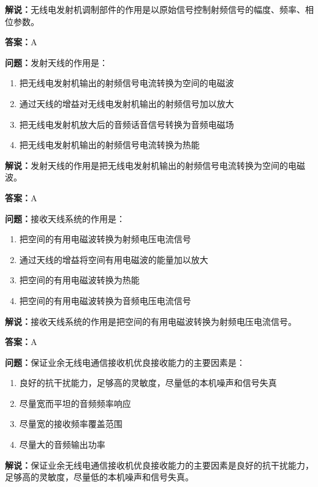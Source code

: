 \textbf{解说：}无线电发射机调制部件的作用是以原始信号控制射频信号的幅度、频率、相位参数。%

\textbf{答案：}A

\textbf{问题：}发射天线的作用是：

\begin{enumerate}[label=\Alph*), leftmargin=1cm]
	\item 把无线电发射机输出的射频信号电流转换为空间的电磁波
	\item 通过天线的增益对无线电发射机输出的射频信号加以放大
	\item 把无线电发射机放大后的音频话音信号转换为音频电磁场
	\item 把无线电发射机输出的射频信号电流转换为热能
\end{enumerate}

\textbf{解说：}发射天线的作用是把无线电发射机输出的射频信号电流转换为空间的电磁波。%

\textbf{答案：}A

\textbf{问题：}接收天线系统的作用是：

\begin{enumerate}[label=\Alph*), leftmargin=1cm]
	\item 把空间的有用电磁波转换为射频电压电流信号
	\item 通过天线的增益将空间有用电磁波的能量加以放大
	\item 把空间的有用电磁波转换为热能
	\item 把空间的有用电磁波转换为音频电压电流信号
\end{enumerate}

\textbf{解说：}接收天线系统的作用是把空间的有用电磁波转换为射频电压电流信号。%

\textbf{答案：}A

\textbf{问题：}保证业余无线电通信接收机优良接收能力的主要因素是：

\begin{enumerate}[label=\Alph*), leftmargin=1cm]
	\item 良好的抗干扰能力，足够高的灵敏度，尽量低的本机噪声和信号失真
	\item 尽量宽而平坦的音频频率响应
	\item 尽量宽的接收频率覆盖范围
	\item 尽量大的音频输出功率
\end{enumerate}

\textbf{解说：}保证业余无线电通信接收机优良接收能力的主要因素是良好的抗干扰能力，足够高的灵敏度，尽量低的本机噪声和信号失真。%

